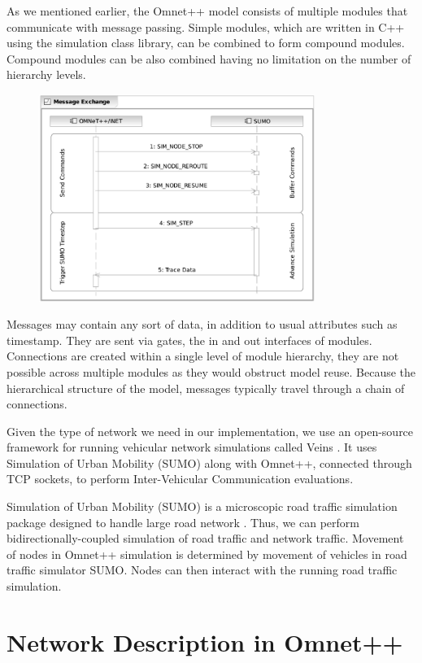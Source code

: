 As we mentioned earlier, the Omnet++ model consists of multiple modules that
communicate with message passing. Simple modules, which are written in C++ using
the simulation class library, can be combined to form compound modules. Compound
modules can be also combined having no limitation on the number of hierarchy
levels.

\begin{figure}[t]
	\centering
	\includegraphics[width=0.8\textwidth]{img/bidirectional_com}
\end{figure}

Messages may contain any sort of data, in addition to usual attributes such as
timestamp. They are sent via gates, the in and out interfaces of modules.
Connections are created within a single level of module hierarchy, they are not
possible across multiple modules as they would obstruct model reuse. Because the
hierarchical structure of the model, messages typically travel through a chain
of connections.

Given the type of network we need in our implementation, we use an
open-source framework for running vehicular network simulations called Veins \cite{veins}.
It uses Simulation of Urban Mobility (SUMO) along with Omnet++, connected
through TCP sockets, to perform Inter-Vehicular Communication evaluations.

Simulation of Urban Mobility (SUMO) is a microscopic road traffic simulation
package designed to handle large road network \cite{sumo}. Thus, we can perform
bidirectionally-coupled simulation of road traffic and network traffic. Movement
of nodes in Omnet++ simulation is determined by movement of vehicles in road
traffic simulator SUMO. Nodes can then interact with the running road traffic
simulation.

\section{Network Description in Omnet++}

